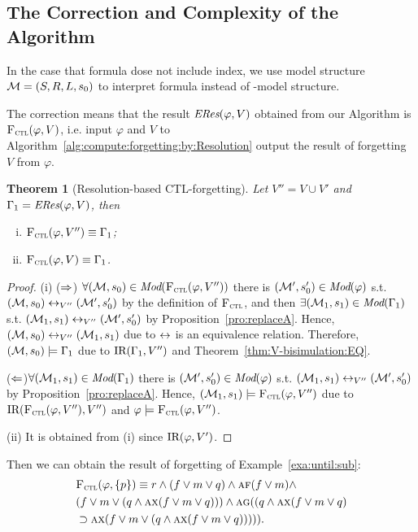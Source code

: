 \documentclass{article}
\newtheorem{theorem}{Theorem}
\begin{document}
\subsection{The Correction and Complexity of the Algorithm}
In the case that formula dose not include index, we use model structure ${\cal M}=(S,R,L, s_0)$ to interpret formula instead of \Ind-model structure.

The correction means that the result $\emph{ERes}(\varphi,V)$ obtained from our Algorithm is ${\textsc{F}_{\textsc{ctl}}}(\varphi, V)$, i.e. input $\varphi$ and $V$ to Algorithm~\ref{alg:compute:forgetting:by:Resolution} output the result of forgetting $V$ from $\varphi$.
\begin{theorem}[Resolution-based CTL-forgetting]\label{thm:Res_based:V_CTLforget}
Let $V''=V \cup V'$ and $\Gamma_1=\emph{ERes}(\varphi,V)$, then %
\begin{enumerate}[(i)]
\item ${\textsc{F}_{\textsc{ctl}}}(\varphi, V'') \equiv \Gamma_1$;
\item ${\textsc{F}_{\textsc{ctl}}}(\varphi, V) \equiv \Gamma_1$.
\end{enumerate}
\end{theorem}
\begin{proof}
(i) ($\Rightarrow$) $\forall ({\cal M},s_0) \in \textit{Mod}({\textsc{F}_{\textsc{ctl}}}(\varphi, V''))$ there is $({\cal M}',s_0') \in \textit{Mod}(\varphi)$ s.t. $({\cal M},s_0) \leftrightarrow_{V''} ({\cal M}', s_0')$ by the definition of ${\textsc{F}_{\textsc{ctl}}}$, and then $\exists ({\cal M}_1, s_1) \in \textit{Mod}(\Gamma_1)$ s.t. $({\cal M}_1,s_1) \leftrightarrow_{V''} ({\cal M}', s_0')$ by Proposition~\ref{pro:replaceA}. Hence, $({\cal M},s_0) \leftrightarrow_{V''} ({\cal M}_1,s_1)$ due to $\leftrightarrow$ is an equivalence relation.
Therefore, $({\cal M},s_0) \models \Gamma_1$ due to $\textrm{IR}(\Gamma_1, V'')$ and Theorem~\ref{thm:V-bisimulation:EQ}.

 ($\Leftarrow$)$\forall ({\cal M}_1, s_1) \in \textit{Mod}(\Gamma_1)$ there is $({\cal M}',s_0') \in \textit{Mod}(\varphi)$ s.t. $({\cal M}_1,s_1) \leftrightarrow_{V''} ({\cal M}', s_0')$ by Proposition~\ref{pro:replaceA}. Hence, $({\cal M}_1, s_1) \models {\textsc{F}_{\textsc{ctl}}}(\varphi, V'')$ due to $\textrm{IR}({\textsc{F}_{\textsc{ctl}}}(\varphi, V''), V'')$ and $\varphi \models {\textsc{F}_{\textsc{ctl}}}(\varphi, V'')$.

 (ii) It is obtained from (i) since $\textrm{IR}(\varphi, V')$.
\end{proof}

Then we can obtain the result of forgetting of Example~\ref{exa:until:sub}:
\begin{align*}
& {\textsc{F}_{\textsc{ctl}}}(\varphi, \{p\}) \equiv r\wedge (f\vee m \vee q)  \wedge  \textsc{a}\textsc{f}(f \vee m) \wedge\\
& (f\vee m \vee (q\wedge \textsc{a}\textsc{x}(f\vee m\vee q)))  \wedge \textsc{a}\textsc{g}((q\wedge \textsc{a}\textsc{x}(f\vee m\vee q)\\
& \supset \textsc{a}\textsc{x}(f\vee m \vee (q\wedge \textsc{a}\textsc{x}(f\vee m\vee q))))).
\end{align*}
\end{document}
